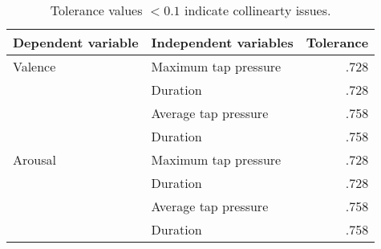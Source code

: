 \begin{table}[]
\centering
\begin{tabular}{@{}llr@{}}
\textbf{Dependent variable} & \textbf{Independent variables} & \textbf{Tolerance} \\ \midrule
Valence                     & Maximum tap pressure           & .728               \\
                            & Duration                       & .728               \\ \cmidrule(l){2-3} 
                            & Average tap pressure           & .758               \\
                            & Duration                       & .758               \\ \midrule
Arousal                     & Maximum tap pressure           & .728               \\
                            & Duration                       & .728               \\ \cmidrule(l){2-3} 
                            & Average tap pressure           & .758               \\
                            & Duration                       & .758              
\end{tabular}
\caption{Tolerance values $< 0.1$ indicate collinearty issues.}
\label{tab:collinearity_tolerance}
\end{table}